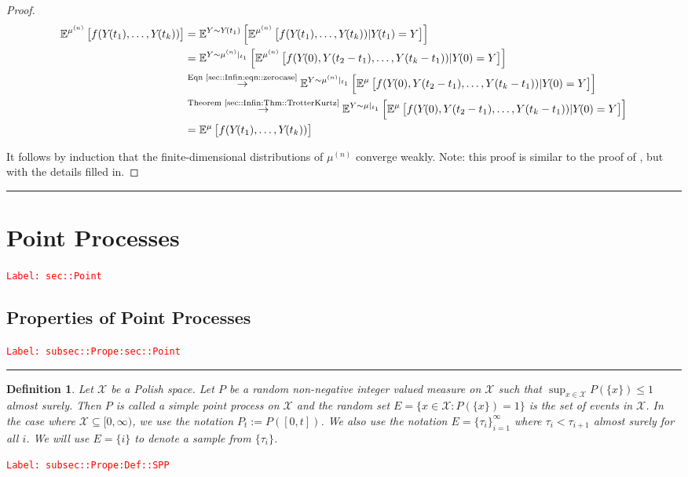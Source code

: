 \documentclass[12pt]{article}
\newcommand{\mb}{\mathbb}
\newcommand{\mc}{\mathcal}
\newcommand{\ra}{\rightarrow}
\newcommand{\os}{\overset}
\newcommand{\te}{\text}
\newcommand{\tr}{\textcolor{red}}
\newcommand{\labe}[1]{\tr{\texttt{Label: #1}}}
\newcommand{\lin}{\rule{\linewidth}{0.4 pt}}
\newcommand{\exmu}[2]{\mb{E}^{#1}\left[#2\right]}	%
\newcommand{\x}{x}								%
\renewcommand{\t}{t}							%
\newcommand{\cind}[1]{_{#1}}					%
\newcommand{\tp}[1]{(#1)}						%
\newcommand{\ts}[1]{_{#1}}						%
\newcommand{\sln}[1]{^{(#1)}}					%
\newcommand{\indx}[1]{_{#1}}					%
\newcommand{\m}{\mu}							%
\newcommand{\XX}{Y}								%
\newcommand{\rt}{\tau}							%
\renewcommand{\it}{k}							%
\newcommand{\rp}{P}								%
\newcommand{\spce}{\mc{X}}						%
\newcommand{\evs}{E}							%
\newtheorem{defn}[thms]{Definition}
\begin{document}
\begin{proof}
\begin{align*}
\exmu{\m\sln{n}}{f(\XX\cind{}\tp{\t\indx{1}},\dots,\XX\cind{}\tp{\t\indx{\it}})}&= \exmu{\XX\sim \XX\cind{}\tp{\t\indx{1}}}{\exmu{\m\sln{n}}{f(\XX\cind{}\tp{\t\indx{1}},\dots,\XX\cind{}\tp{\t\indx{\it}})|\XX\cind{}\tp{\t\indx{1}}=\XX}}\\
&=\exmu{\XX\sim \m\sln{n}|_{\t\indx{1}}}{\exmu{\m\sln{n}}{f(\XX\cind{}\tp{0},\XX\tp{\t\indx{2}-\t\indx{1}},\dots,\XX\tp{\t\indx{\it}-\t\indx{1}})|\XX\cind{}\tp{0}=\XX}}\\
&\os{\te{Eqn \eqref{sec::Infin:eqn::zerocase}}}{\ra} \exmu{\XX\sim \m\sln{n}|_{\t\indx{1}}}{\exmu{\m}{f(\XX\cind{}\tp{0},\XX\tp{\t\indx{2}-\t\indx{1}},\dots,\XX\tp{\t\indx{\it}-\t\indx{1}})|\XX\cind{}\tp{0}=\XX}}\\
&\os{\te{Theorem \ref{sec::Infin:Thm::TrotterKurtz}}}{\ra} \exmu{\XX\sim \m|_{\t\indx{1}}}{\exmu{\m}{f(\XX\cind{}\tp{0},\XX\tp{\t\indx{2}-\t\indx{1}},\dots,\XX\tp{\t\indx{\it}-\t\indx{1}})|\XX\cind{}\tp{0}=\XX}}\\
&=\exmu{\m}{f(\XX\cind{}\tp{\t\indx{1}},\dots,\XX\cind{}\tp{\t\indx{\it}})}
\end{align*}

It follows by induction that the finite-dimensional distributions of \(\m\sln{n}\) converge weakly. Note: this proof is similar to the proof of \cite[Theorem 4.2]{Kur81}, but with the details filled in.
\end{proof}

\lin 

\section{Point Processes}
\label{sec::Point}\labe{sec::Point}

\subsection{Properties of Point Processes}
\label{subsec::Prope:sec::Point}\labe{subsec::Prope:sec::Point}

\lin

\begin{defn}
Let \(\spce\) be a Polish space. Let \(\rp\) be a random non-negative integer valued measure on \(\spce\) such that \(\sup_{\x \in \spce} \rp(\{\x\})\leq 1\) almost surely. Then \(\rp\) is called a simple point process on \(\spce\) and the random set \(E = \{\x \in \spce: \rp(\{\x\}) = 1\}\) is the set of events in \(\spce\). In the case where \(\spce \subseteq [0,\infty)\), we use the notation \(\rp\ts{\t} := \rp([0,\t])\). We also use the notation \(\evs = \{\rt\indx{i}\}_{i=1}^{\infty}\) where \(\rt\indx{i} < \rt\indx{i+1}\) almost surely for all \(i\). We will use \(\evs = \{	{i}\}\) to denote a sample from \(\{\rt\indx{i}\}\).
\label{subsec::Prope:Def::SPP}
\end{defn}
\labe{subsec::Prope:Def::SPP}
\end{document}
